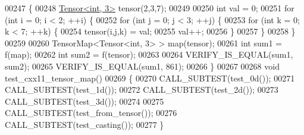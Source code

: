 \begin{DoxyCode}
00247 \{
00248   \hyperlink{class_eigen_1_1_tensor}{Tensor<int, 3>} tensor(2,3,7);
00249 
00250   \textcolor{keywordtype}{int} val = 0;
00251   \textcolor{keywordflow}{for} (\textcolor{keywordtype}{int} i = 0; i < 2; ++i) \{
00252     \textcolor{keywordflow}{for} (\textcolor{keywordtype}{int} j = 0; j < 3; ++j) \{
00253       \textcolor{keywordflow}{for} (\textcolor{keywordtype}{int} k = 0; k < 7; ++k) \{
00254         tensor(i,j,k) = val;
00255         val++;
00256       \}
00257     \}
00258   \}
00259 
00260   TensorMap<Tensor<int, 3> > map(tensor);
00261   \textcolor{keywordtype}{int} sum1 = f(map);
00262   \textcolor{keywordtype}{int} sum2 = f(tensor);
00263 
00264   VERIFY\_IS\_EQUAL(sum1, sum2);
00265   VERIFY\_IS\_EQUAL(sum1, 861);
00266 \}
00267 
00268 \textcolor{keywordtype}{void} test\_cxx11\_tensor\_map()
00269 \{
00270   CALL\_SUBTEST(test\_0d());
00271   CALL\_SUBTEST(test\_1d());
00272   CALL\_SUBTEST(test\_2d());
00273   CALL\_SUBTEST(test\_3d());
00274 
00275   CALL\_SUBTEST(test\_from\_tensor());
00276   CALL\_SUBTEST(test\_casting());
00277 \}
\end{DoxyCode}
